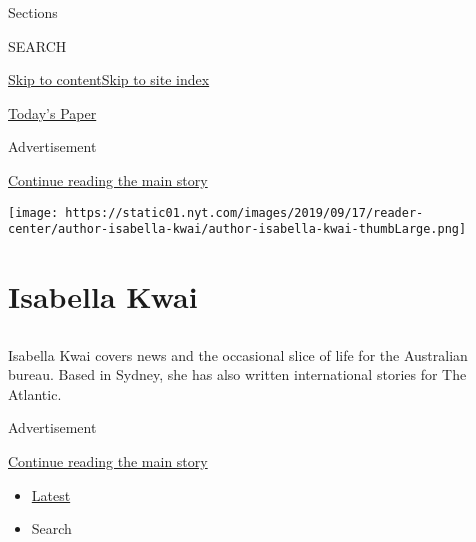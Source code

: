 Sections

SEARCH

\protect\hyperlink{site-content}{Skip to
content}\protect\hyperlink{site-index}{Skip to site index}

\href{https://myaccount.nytimes.com/auth/login?response_type=cookie\&client_id=vi}{}

\href{https://www.nytimes.com/section/todayspaper}{Today's Paper}

Advertisement

\protect\hyperlink{after-top}{Continue reading the main story}

\texttt{[image: https://static01.nyt.com/images/2019/09/17/reader-center/author-isabella-kwai/author-isabella-kwai-thumbLarge.png]}

\hypertarget{isabella-kwai}{%
\section{Isabella Kwai}\label{isabella-kwai}}

\subsection{}

Isabella Kwai covers news and the occasional slice of life for the
Australian bureau. Based in Sydney, she has also written international
stories for The Atlantic.

Advertisement

\protect\hyperlink{after-mid1}{Continue reading the main story}

\begin{itemize}
\tightlist
\item
  \protect\hyperlink{stream-panel}{Latest}
\item
  Search
\end{itemize}

